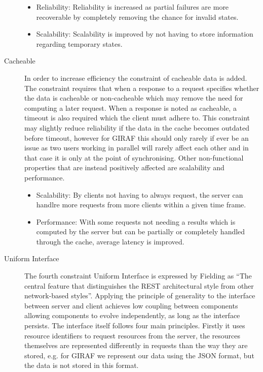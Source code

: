 \begin{description}
\begin{itemize}
        \item Reliability: Reliability is increased as partial failures are more recoverable by completely removing the chance for invalid states.
        \item Scalability: Scalability is improved by not having to store information regarding temporary states.
    \end{itemize}
    \item [Cacheable] In order to increase efficiency the constraint of cacheable data is added.
    The constraint requires that when a response to a request specifies whether the data is cacheable or non-cacheable which may remove the need for computing a later request.
    When a response is noted as cacheable, a timeout is also required which the client must adhere to.
    This constraint may slightly reduce reliability if the data in the cache becomes outdated before timeout, however for GIRAF this should only rarely if ever be an issue as two users working in parallel will rarely affect each other and in that case it is only at the point of synchronising.
    Other non-functional properties that are instead positively affected are scalability and performance.
    \begin{itemize}
        \item Scalability: By clients not having to always request, the server can handlre more requests from more clients within a given time frame.
        \item Performance: With some requests not needing a results which is computed by the server but can be partially or completely handled through the cache, average latency is improved.
    \end{itemize}
    \item [Uniform Interface] The fourth constraint Uniform Interface is expressed by Fielding as \enquote{The central feature that distinguishes the REST architectural style from other network-based styles}\citep{fielding2000rest}.
    Applying the principle of generality to the interface between server and client achieves low coupling between components allowing components to evolve independently, as long as the interface persists.
    The interface itself follows four main principles.
    Firstly it uses resource identifiers to request resources from the server, the resources themselves are represented differently in requests than the way they are stored, e.g. for GIRAF we represent our data using the JSON format, but the data is not stored in this format.

\end{description}
